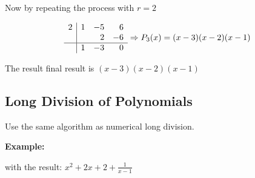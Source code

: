 Now by repeating the process with \(r = 2\)

\[
  \begin{array}{r|rrr}
  2 & 1 & -5 & 6 \\
    &   &  2 & -6 \\
  \hline
    & 1 & -3 & 0 \\
  \end{array}
  \Rightarrow P_3(x) = (x - 3)(x - 2)(x - 1)
\]

The result final result is \((x - 3)(x - 2)(x - 1)\)

\subsection{Long Division of Polynomials}

Use the same algorithm as numerical long division.

\textbf{Example:}


with the result: \(x^2 +2x + 2 + \frac{1}{x-1}\)
